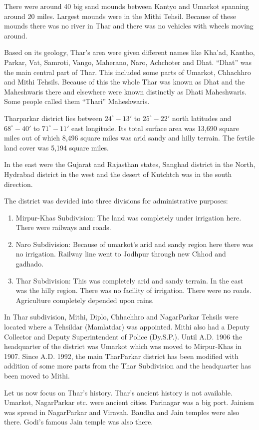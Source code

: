 There were around 40 big sand mounds between Kantyo and Umarkot spanning around
20 miles. Largest mounds were in the Mithi Tehsil. Because of these mounds
there was no river in Thar and there was no vehicles with wheels moving around.

Based on its geology, Thar's area were given different names like Kha'ad,
Kantho, Parkar, Vat, Samroti, Vango, Maherano, Naro, Achchoter and Dhat.
``Dhat'' was the main central part of Thar. This included some parts of
Umarkot, Chhachhro and Mithi Tehsils. Because of this the whole Thar was known
as Dhat and the Maheshwaris there and elsewhere were known distinctly as Dhati
Maheshwaris. Some people called them ``Thari'' Maheshwaris.

Tharparkar district lies between $24^\circ-13'$ to $25^\circ-22'$ north
latitudes and $68^\circ-40'$ to $71^\circ-11'$ east longitude. Its total
surface area was 13,690 square miles out of which 8,496 square miles was arid
sandy and hilly terrain. The fertile land cover was 5,194 square miles.

In the east were the Gujarat and Rajasthan states, Sanghad district in the
North, Hydrabad district in the west and the desert of Kutchtch was in the
south direction.

The district was devided into three divisions for administrative purposes:
\begin{enumerate}
\item Mirpur-Khas Subdivision: The land was completely under irrigation here. There were railways and roads.
\item Naro Subdivision: Because of umarkot's arid and sandy region here there was no irrigation. Railway line went to Jodhpur through new Chhod and gadhado.
\item Thar Subdivision: This was completely arid and sandy terrain. In the east was the hilly region. There was no facility of irrigation. There were no roads. Agriculture completely depended upon rains.
\end{enumerate}
In Thar subdivision, Mithi, Diplo, Chhachhro and NagarParkar Tehsils were
located where a Tehsildar (Mamlatdar) was appointed. Mithi also had a Deputy
Collector and Deputy Superintendent of Police (Dy.S.P.). Until A.D. 1906 the
headquarter of the district was Umarkot which was moved to Mirpur-Khas in 1907.
Since A.D. 1992, the main TharParkar district has been modified with addition
of some more parts from the Thar Subdivision and the headquarter has been moved
to Mithi.

Let us now focus on Thar's history. Thar's ancient history is not available.
Umarkot, NagarParkar etc. were ancient cities. Parinagar was a big port.
Jainism was spread in NagarParkar and Viravah. Baudha and Jain temples were
also there. Godi's famous Jain temple was also there.

